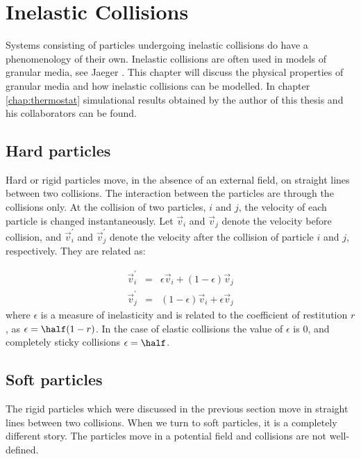 
\chapter{Inelastic Collisions}
\label{chap:Inelas}
Systems consisting of particles undergoing inelastic collisions do
have a phenomenology of their own. Inelastic collisions are often used
in models of granular media, see \eg Jaeger \etal \cite{Jaeger96}. This
chapter will discuss the physical properties of granular media and how
inelastic collisions can be modelled. In chapter \ref{chap:thermostat}
simulational results obtained by the author of this thesis and his
collaborators can be found.

\section{Hard particles}
\label{sect:HardParticles}
Hard or rigid particles move, in the absence of an external field, on
straight lines between two collisions. The interaction between
the particles are through the collisions only. At the collision of two
particles, $i$ and $j$, the velocity of each particle is changed
instantaneously. Let $\vec{v}_i$ and $\vec{v}_j$ denote the velocity
before collision, and $\vec{v}_i^{\prime}$ and $\vec{v}_j^{\prime}$
denote the velocity after the collision of particle $i$ and $j$,
respectively. They are related as:

\begin{subequations}
  \begin{eqnarray}
    \vec{v}_i^{\prime} &=& \epsilon \vec{v}_i + (1-\epsilon) \vec{v}_j
    \\
    \vec{v}_j^{\prime} &=& (1-\epsilon) \vec{v}_i + \epsilon \vec{v}_j
  \end{eqnarray}
\end{subequations}
where $\epsilon$ is a measure of inelasticity and is related to the
coefficient of restitution $r$, as $\epsilon = \half (1-r)$. In the case
of elastic collisions the value of $\epsilon$ is $0$, and completely
sticky collisions $\epsilon = \half$. 


\section{Soft particles}
\label{sect:SoftParticles}
The rigid particles which were discussed in the previous section move
in straight lines between two collisions. When we turn to soft
particles, it is a completely different story. The particles move in a
potential field and collisions are not well-defined. 

